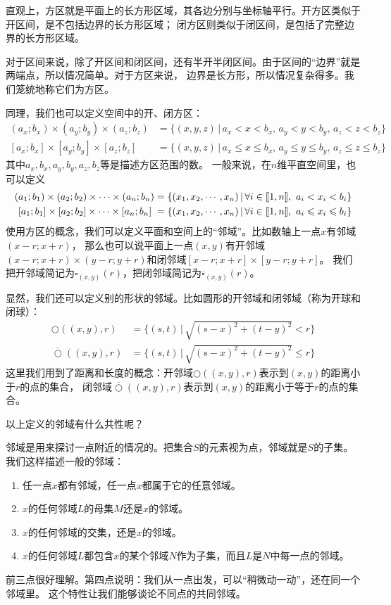\documentclass[12pt,UTF8]{ctexbook}
\begin{document}
直观上，方区就是平面上的长方形区域，其各边分别与坐标轴平行。开方区类似于开区间，是不包括边界的长方形区域；
闭方区则类似于闭区间，是包括了完整边界的长方形区域。

对于区间来说，除了开区间和闭区间，还有半开半闭区间。由于区间的“边界”就是两端点，所以情况简单。对于方区来说，
边界是长方形，所以情况复杂得多。我们笼统地称它们为方区。

同理，我们也可以定义空间中的开、闭方区：
\begin{align*}
    (a_x;b_x)\times(a_y;b_y)\times(a_z;b_z) &= \{(x, y, z) \, | \, a_x < x < b_x,\, a_y < y < b_y,\, a_z < z < b_z\} \\
    [a_x;b_x]\times[a_y;b_y]\times[a_z;b_z]\; &= \{(x, y, z) \, | \, a_x \leqslant  x \leqslant b_x,\, a_y \leqslant y \leqslant b_y,\, a_z \leqslant z \leqslant b_z\}
\end{align*}
其中$a_x, b_x, a_y, b_y, a_z, b_z$等是描述方区范围的数。
一般来说，在$n$维平直空间里，也可以定义
\begin{align*}
    (a_1;b_1)\times(a_2;b_2)\times\cdots\times(a_n;b_n) &= \{(x_1, x_2, \cdots, x_n) \, | \, \forall i\in[\![1,n]\!],\,\, a_i < x_i < b_i\} \\
    [a_1;b_1]\times[a_2;b_2]\times\cdots\times[a_n;b_n]\; &= \{(x_1, x_2, \cdots, x_n) \, | \, \forall i\in[\![1,n]\!],\,\, a_i \leqslant x_i \leqslant b_i\} 
\end{align*}
使用方区的概念，我们可以定义平面和空间上的“邻域”。比如数轴上一点$x$有邻域$(x-r;x+r)$，
那么也可以说平面上一点$(x, y)$有开邻域$(x-r;x+r)\times(y-r;y+r)$和闭邻域$[x-r;x+r]\times[y-r;y+r]$。
我们把开邻域简记为$\square_{(x,y)}(r)$，把闭邻域简记为$\overline{\square}_{(x,y)}(r)$。

显然，我们还可以定义别的形状的邻域。比如圆形的开邻域和闭邻域（称为开球和闭球）：
\begin{align*}
    \bigcirc((x,y),r) &= \{(s, t) \, | \, \sqrt{(s - x)^2 + (t - y)^2} < r\} \\
    \overline{\bigcirc}((x,y),r) &= \{(s, t) \, | \, \sqrt{(s - x)^2 + (t - y)^2} \leqslant r\}
\end{align*}
这里我们用到了距离和长度的概念：开邻域$\bigcirc((x,y),r)$表示到$(x, y)$的距离小于$r$的点的集合，
闭邻域$\overline{\bigcirc}((x,y),r)$表示到$(x, y)$的距离小于等于$r$的点的集合。

以上定义的邻域有什么共性呢？

邻域是用来探讨一点附近的情况的。把集合$S$的元素视为点，邻域就是$S$的子集。我们这样描述一般的邻域：
\begin{enumerate}
    \item 任一点$x$都有邻域，任一点$x$都属于它的任意邻域。
    \item $x$的任何邻域$L$的母集$M$还是$x$的邻域。
    \item $x$的任何邻域的交集，还是$x$的邻域。
    \item $x$的任何邻域$L$都包含$x$的某个邻域$N$作为子集，而且$L$是$N$中每一点的邻域。
\end{enumerate}
前三点很好理解。第四点说明：我们从一点出发，可以“稍微动一动”，还在同一个邻域里。
这个特性让我们能够谈论不同点的共同邻域。
\end{document}
